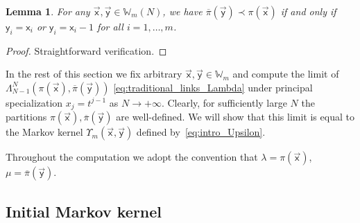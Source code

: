 \documentclass[11pt]{article}
\numberwithin{equation}{section}
\numberwithin{equation}{section}
\newtheorem{Lemma}[Theorem]{Lemma}
\begin{document}
\begin{Lemma}	\label{lemma:interlacing}
	For any $\vec{\mathsf{x}},\vec{\mathsf{y}}\in \mathbb{W}_m(N)$,
	we have $\overline\pi(\vec{\mathsf{y}})\prec \pi(\vec{\mathsf{x}})$
	if and only if $\mathsf{y}_i=\mathsf{x}_i$ or $\mathsf{y}_i=\mathsf{x}_i-1$
	for all $i=1,\dots,m $.
\end{Lemma}
\begin{proof}
	Straightforward verification.
\end{proof}

In the rest of this section we
fix arbitrary $\vec{\mathsf{x}},\vec{\mathsf{y}}\in \mathbb{W}_m$ and
compute the limit of
$\Lambda^{N}_{N-1}(\pi(\vec{\mathsf{x}}),\overline\pi(\vec{\mathsf{y}}))$
\eqref{eq:traditional_links_Lambda}
under principal
specialization $x_j=t^{j-1}$
as $N\to+\infty$. Clearly, for sufficiently large $N$ the
partitions
$\pi(\vec{\mathsf{x}}),\overline\pi(\vec{\mathsf{y}})$
are well-defined.
We will show that this limit is equal
to the Markov kernel $\Upsilon_m(\vec{\mathsf{x}},\vec{\mathsf{y}})$
defined by~\eqref{eq:intro_Upsilon}.

Throughout the computation we adopt the convention
that
$\lambda=\pi(\vec{\mathsf{x}})$, $\mu=\overline\pi(\vec{\mathsf{y}})$.

\subsection{Initial Markov kernel}\label{sub:computation_initial_formula}
\end{document}
